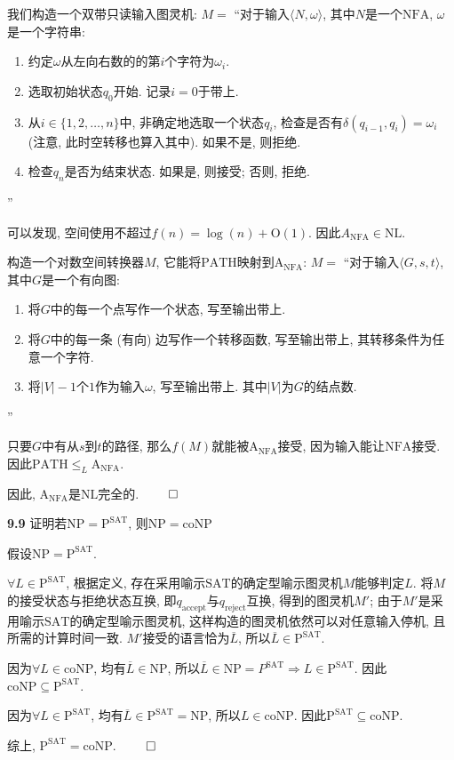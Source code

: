 \documentclass[UTF8]{report}
\renewcommand{\P}{\mathbb{P}} %
\newcommand{\problem}[1]{{\setlength{\parskip}{10pt}\noindent \bf{#1}}}
\renewenvironment{proof}{{\setlength{\parskip}{7pt}\noindent\hskip 2em \bf 证明 \quad}}{\hfill$\qed$\par}
\newcommand{\NP}{\mathrm{NP}}
\newcommand{\coNP}{\mathrm{coNP}}
\newcommand{\SAT}{\mathrm{SAT}}
\renewcommand{\P}{\mathrm{P}}
\newcommand{\NFA}{\mathrm{NFA}}
\renewcommand{\O}{\mathrm{O}}
\newcommand{\NL}{\mathrm{NL}}
\newcommand{\PATH}{\mathrm{PATH}}
\newcommand{\A}{\mathrm{A}}
\begin{document}
\begin{proof}
    我们构造一个双带只读输入图灵机: $M =$ ``对于输入$\langle N,\omega \rangle$, 其中$N$是一个$\NFA$, $\omega$是一个字符串:
    \begin{enumerate}
        \item 约定$\omega$从左向右数的的第$i$个字符为$\omega_i$.
        \item 选取初始状态$q_0$开始. 记录$i=0$于带上.
        \item 从$i \in \{1, 2, \dots , n\}$中, 非确定地选取一个状态$q_i$, 检查是否有$\delta(q_{i-1}, q_i) = \omega_i$ (注意, 此时空转移也算入其中). 如果不是, 则拒绝.
        \item 检查$q_n$是否为结束状态. 如果是, 则接受; 否则, 拒绝.
    \end{enumerate}
    ''

    可以发现, 空间使用不超过$f(n) = \log(n) + \O(1)$. 因此$A_{\NFA} \in \NL$.

    构造一个对数空间转换器$M$, 它能将$\PATH$映射到$\A_{\NFA}$: $M =$ ``对于输入$\langle G, s, t \rangle$, 其中$G$是一个有向图:
    \begin{enumerate}
        \item 将$G$中的每一个点写作一个状态, 写至输出带上.
        \item 将$G$中的每一条 (有向) 边写作一个转移函数, 写至输出带上, 其转移条件为任意一个字符.
        \item 将$|V|-1$个$1$作为输入$\omega$, 写至输出带上. 其中$|V|$为$G$的结点数.
    \end{enumerate}
    ''

    只要$G$中有从$s$到$t$的路径, 那么$f(M)$就能被$\A_{\NFA}$接受, 因为输入能让$\NFA$接受. 因此$\PATH \leq_L \A_{\NFA}$.

    因此, $\A_{\NFA}$是$\NL$完全的.
\end{proof}


\problem{9.9} 证明若$\NP = \P^{\SAT}$, 则$\NP = \coNP$

\begin{proof}
    假设$\NP = \P^{\SAT}$.

    $\forall L \in \P^{\SAT}$, 根据定义, 存在采用喻示$\SAT$的确定型喻示图灵机$M$能够判定$L$. 将$M$的接受状态与拒绝状态互换, 即$q_{\mathrm{accept}}$与$q_{\mathrm{reject}}$互换, 得到的图灵机$M'$; 由于$M'$是采用喻示$\SAT$的确定型喻示图灵机, 这样构造的图灵机依然可以对任意输入停机, 且所需的计算时间一致. $M'$接受的语言恰为$\overline{L}$, 所以$\overline{L} \in \P^{\SAT}$.

    因为$\forall L \in \coNP$, 均有$\overline{L} \in \NP$, 所以$\overline{L} \in \NP = P^{\SAT} \Longrightarrow L \in \P^{\SAT}$. 因此$\coNP \subseteq \P^{\SAT}$.

    因为$\forall L \in \P^{\SAT}$, 均有$\overline{L} \in \P^{\SAT} = \NP$, 所以$L \in \coNP$. 因此$\P^{\SAT} \subseteq \coNP$.

    综上, $\P^{\SAT} = \coNP$.
\end{proof}
\end{document}
